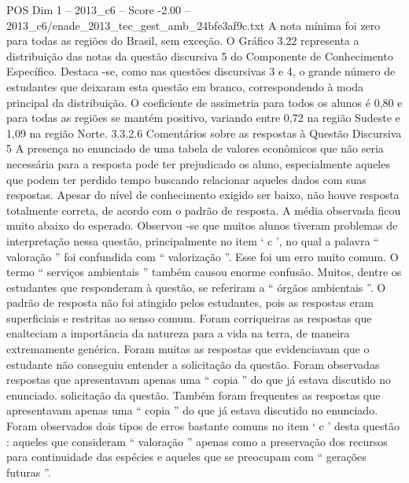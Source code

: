 \begin{textsample}{POS Dim 1 – 2013\_c6 – Score -2.00 – 2013\_c6/enade\_2013\_tec\_gest\_amb\_24bfe3af9c.txt}
A nota mínima foi zero para todas as regiões do Brasil, sem exceção.
O Gráfico 3.22 representa a distribuição das notas da questão discursiva 5 do Componente de Conhecimento Específico.
Destaca -se, como nas questões discursivas 3 e 4, o grande número de estudantes que deixaram esta questão em branco, correspondendo à moda principal da distribuição.
O coeficiente de assimetria para todos os alunos é 0,80 e para todas as regiões se mantém positivo, variando entre 0,72 na região Sudeste e 1,09 na região Norte. 3.3.2.6 Comentários sobre as respostas à Questão Discursiva 5 A presença no enunciado de uma tabela de valores econômicos que não seria necessária para a resposta pode ter prejudicado os aluno, especialmente aqueles que podem ter perdido tempo buscando relacionar aqueles dados com suas respostas.
Apesar do nível de conhecimento exigido ser baixo, não houve resposta totalmente correta, de acordo com o padrão de resposta.
A média observada ficou muito abaixo do esperado.
Observou -se que muitos alunos tiveram problemas de interpretação nessa questão, principalmente no item ‘ c ’, no qual a palavra “ valoração ” foi confundida com “ valorização ”.
Esse foi um erro muito comum.
O termo “ serviços ambientais ” também causou enorme confusão.
Muitos, dentre os estudantes que responderam à questão, se referiram a “ órgãos ambientais ”.
O padrão de resposta não foi atingido pelos estudantes, pois as respostas eram superficiais e restritas ao senso comum.
Foram corriqueiras as respostas que enalteciam a importância da natureza para a vida na terra, de maneira extremamente genérica.
Foram muitas as respostas que evidenciavam que o estudante não conseguiu entender a solicitação da questão.
Foram observadas respostas que apresentavam apenas uma “ copia ” do que já estava discutido no enunciado. solicitação da questão.
Também foram frequentes as respostas que apresentavam apenas uma “ copia ” do que já estava discutido no enunciado.
Foram observados dois tipos de erros bastante comuns no item ‘ c ’ desta questão : aqueles que consideram “ valoração ” apenas como a preservação dos recursos para continuidade das espécies e aqueles que se preocupam com “ gerações futuras ”.

\end{textsample}
